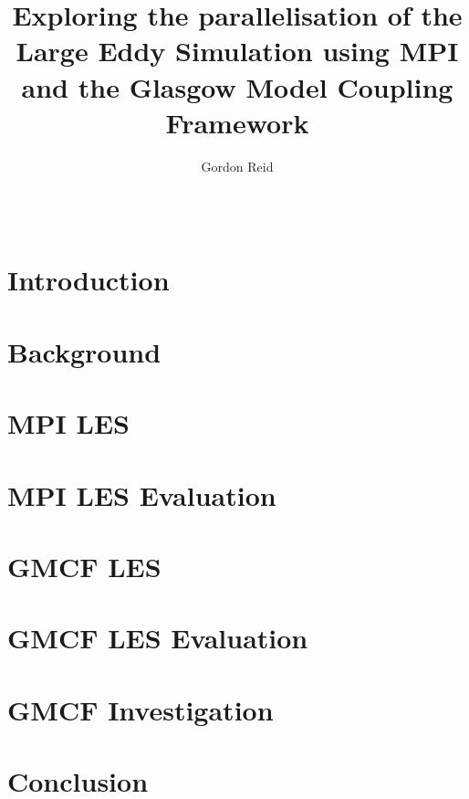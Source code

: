 \documentclass{acm_proc_article-sp}
\title{Exploring the parallelisation of the Large Eddy Simulation using MPI and
the Glasgow Model Coupling Framework}
\author{
    \alignauthor
    Gordon Reid\\
    \affaddr{School of Computing Science}\\
    \affaddr{University of Glasgow}\\
    \email{1002536r@student.gla.ac.uk}
}
\begin{document}
\maketitle

\begin{abstract}

\end{abstract}

\section{Introduction}


\section{Background}
\label{sec:Background}

\section{MPI LES}
\label{sec:MPILES}

\section{MPI LES Evaluation}
\label{sec:MPILESEval}

\section{GMCF LES}
\label{sec:GMCFLES}

\section{GMCF LES Evaluation}
\label{sec:GMCFLESEval}

\section{GMCF Investigation}
\label{sec:GMCFInvestigation}

\section{Conclusion}
\label{sec:Conclusion}



\end{document}
